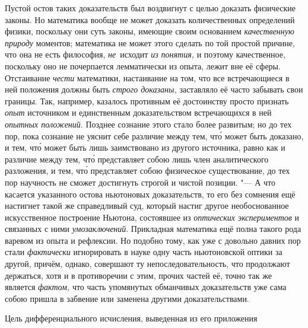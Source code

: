 Пустой остов таких доказательств был воздвигнут с целью доказать физические
законы. Но математика вообще не может доказать количественных определений
физики, поскольку они суть законы, имеющие своим основанием {\em качественную
природу} моментов; математика не может этого сделать по той простой причине,
что она не есть философия, {\em не}~исходит {\em из понятия,} и поэтому
качественное, поскольку оно не почерпается лемматически из опыта, лежит вне её
сферы. Отстаивание {\em чести} математики, настаивание на том, что все
встречающиеся в ней положения должны быть {\em строго доказаны,} заставляло её
часто забывать свои границы. Так, например, казалось противным её достоинству
просто признать {\em опыт} источником и единственным доказательством
встречающихся в ней {\em опытных положений}. Позднее сознание этого
стало более развитым; но до тех пор, пока сознание не уяснит
себе различие между тем, чт\'{о} может быть доказано, и тем, чт\'{о} может быть лишь
заимствовано из другого источника, равно как и различие между тем, чт\'{о}
представляет собою лишь член аналитического разложения, и тем, чт\'{о} представляет
собою физическое существование, до тех пор научность не сможет достигнуть
строгой и чистой позиции. "--- А что касается указанного остова ньютоновых
доказательств, то его без сомнения ещё настигнет такой же справедливый суд,
который настиг другое необоснованное искусственное построение Ньютона,
состоявшее из {\em оптических экспериментов} и связанных с ними
{\em умозаключений}. Прикладная математика ещё полна такого рода варевом из
опыта и рефлексии. Но подобно тому, как уже с довольно давних пор стали
{\em фактически} игнорировать в науке одну часть ньютоновской оптики за другой,
причём, однако, совершают ту непоследовательность, что продолжают держаться,
хотя и в противоречии с этим, прочих частей её, точно так же является
{\em фактом,} что часть упомянутых обманчивых доказательств уже сама собою
пришла в забвение или заменена другими доказательствами.

\subsubremark%
{Цель дифференциального исчисления, выведенная из его приложения}

